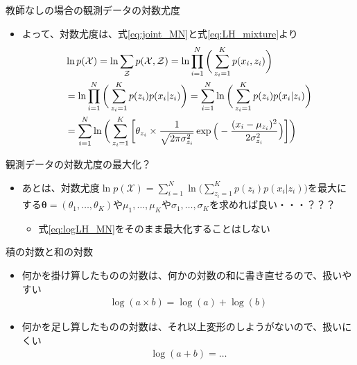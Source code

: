 \documentclass[aspectratio=169,unicode,dvipdfmx,14pt]{beamer}
\begin{document}
\begin{frame}{教師なしの場合の観測データの対数尤度}
\begin{itemize}
\item よって、対数尤度は、式\eqref{eq:joint_MN}と式\eqref{eq:LH_mixture}より
\vspace{-.1in}
\begin{align}
& \ln p(\mathcal{X}) = \ln \sum_{\mathcal{Z}} p(\mathcal{X}, \mathcal{Z})
= \ln \prod_{i=1}^N \bigg( \sum_{z_i=1}^K p(x_i , z_i) \bigg)
\notag \\ &
= \ln \prod_{i=1}^N \bigg( \sum_{z_i=1}^K p(z_i) p(x_i | z_i) \bigg)
= \sum_{i=1}^N \ln \bigg( \sum_{z_i=1}^K p(z_i) p(x_i | z_i) \bigg)
\notag \\ &
= \sum_{i=1}^N \ln \bigg( \sum_{z_i=1}^K \bigg[ \theta_{z_i} \times \frac{1}{\sqrt{2\pi\sigma_{z_i}^2}}\exp\Big( - \frac{(x_i - \mu_{z_i})^2}{2\sigma_{z_i}^2} \Big) \bigg] \bigg)
\label{eq:logLH_MN}
\end{align}
\end{itemize}
\end{frame}

\begin{frame}{観測データの対数尤度の最大化？}
\begin{itemize}
\item あとは、対数尤度$\ln p(\mathcal{X}) = \sum_{i=1}^N \ln \Big( \sum_{z_i=1}^K p(z_i) p(x_i | z_i) \Big)$を最大にする$\bm{\theta}=(\theta_1,\ldots,\theta_K)$や$\mu_1,\ldots,\mu_K$や$\sigma_1,\ldots,\sigma_K$を求めれば良い・・・？？？
\begin{itemize}
\item 式\eqref{eq:logLH_MN}をそのまま最大化することはしない
\end{itemize}
\end{itemize}
\end{frame}


\begin{frame}{積の対数と和の対数}
\begin{itemize}
\item 何かを掛け算したものの対数は、何かの対数の和に書き直せるので、扱いやすい
\begin{align}
\log(a \times b) = \log(a) + \log(b)
\end{align}
\item 何かを足し算したものの対数は、それ以上変形のしようがないので、扱いにくい
\begin{align}
\log(a + b) = \ldots
\end{align}\end{itemize}
\end{frame}
\end{document}
